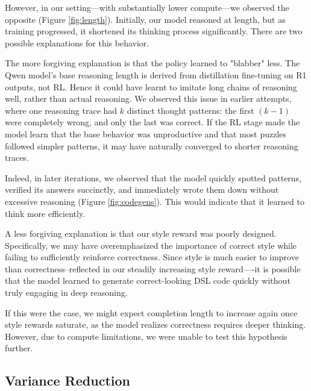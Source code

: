 \documentclass{article}
\begin{document}
However, in our setting—with substantially lower compute—we observed the opposite (Figure \ref{fig:length}). Initially, our model reasoned at length, but as training progressed, it shortened its thinking process significantly. There are two possible explanations for this behavior.

The more forgiving explanation is that the policy learned to "blabber" less. The Qwen model's base reasoning length is derived from distillation fine-tuning on R1 outputs, not RL. Hence it could have learnt to imitate long chains of reasoning well, rather than actual reasoning. We observed this issue in earlier attempts, where one reasoning trace had $k$ distinct thought patterns: the first $(k-1)$ were completely wrong, and only the last was correct. If the RL stage made the model learn that the base behavior was unproductive and that most puzzles followed simpler patterns, it may have naturally converged to shorter reasoning traces.

Indeed, in later iterations, we observed that the model quickly spotted patterns, verified its answers succinctly, and immediately wrote them down without excessive reasoning (Figure \ref{fig:codegens}). This would indicate that it learned to think more efficiently.

A less forgiving explanation is that our style reward was poorly designed. Specifically, we may have overemphasized the importance of correct style while failing to sufficiently reinforce correctness. Since style is much easier to improve than correctness--reflected in our steadily increasing style reward—-it is possible that the model learned to generate correct-looking DSL code quickly without truly engaging in deep reasoning.

If this were the case, we might expect completion length to increase again once style rewards saturate, as the model realizes correctness requires deeper thinking. However, due to compute limitations, we were unable to test this hypothesis further.

\subsection{Variance Reduction}
\end{document}

